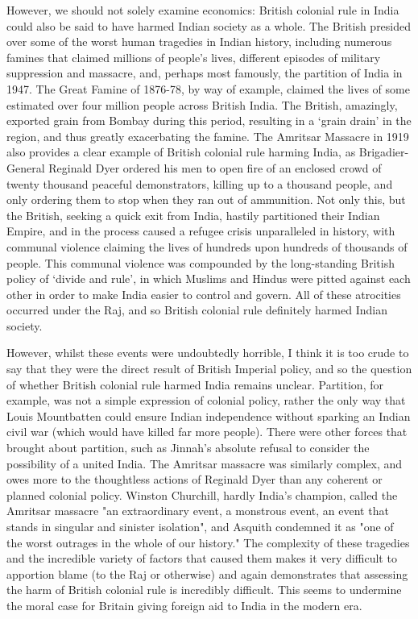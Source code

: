    However, we should not solely examine economics: British colonial rule
   in India could also be said to have harmed Indian society as a whole.
   The British presided over some of the worst human tragedies in Indian
   history, including numerous famines that claimed millions of people's
   lives, different episodes of military suppression and massacre, and,
   perhaps most famously, the partition of India in 1947. The Great Famine
   of 1876-78, by way of example, claimed the lives of some estimated over
   four million people across British India. The British, amazingly,
   exported grain from Bombay during this period, resulting in a `grain
   drain' in the region, and thus greatly exacerbating the famine. The
   Amritsar Massacre in 1919 also provides a clear example of British
   colonial rule harming India, as Brigadier-General Reginald Dyer ordered
   his men to open fire of an enclosed crowd of twenty thousand peaceful
   demonstrators, killing up to a thousand people, and only ordering them
   to stop when they ran out of ammunition. Not only this, but the
   British, seeking a quick exit from India, hastily partitioned their
   Indian Empire, and in the process caused a refugee crisis unparalleled
   in history, with communal violence claiming the lives of hundreds upon
   hundreds of thousands of people. This communal violence was compounded
   by the long-standing British policy of `divide and rule', in which
   Muslims and Hindus were pitted against each other in order to make
   India easier to control and govern. All of these atrocities occurred
   under the Raj, and so British colonial rule definitely harmed Indian
   society.

   However, whilst these events were undoubtedly horrible, I think it is
   too crude to say that they were the direct result of British Imperial
   policy, and so the question of whether British colonial rule harmed
   India remains unclear. Partition, for example, was not a simple
   expression of colonial policy, rather the only way that Louis
   Mountbatten could ensure Indian independence without sparking an Indian
   civil war (which would have killed far more people). There were other
   forces that brought about partition, such as Jinnah's absolute refusal
   to consider the possibility of a united India. The Amritsar massacre
   was similarly complex, and owes more to the thoughtless actions of
   Reginald Dyer than any coherent or planned colonial policy. Winston
   Churchill, hardly India's champion, called the Amritsar massacre "an
   extraordinary event, a monstrous event, an event that stands in
   singular and sinister isolation", and Asquith condemned it as "one of
   the worst outrages in the whole of our history." The complexity of
   these tragedies and the incredible variety of factors that caused them
   makes it very difficult to apportion blame (to the Raj or otherwise)
   and again demonstrates that assessing the harm of British colonial rule
   is incredibly difficult. This seems to undermine the moral case for
   Britain giving foreign aid to India in the modern era.


